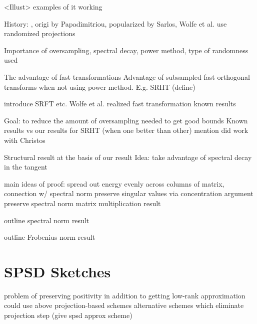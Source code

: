 \documentclass[xcolor={svgnames,pdftex,dvipsnames,table},10pt]{beamer} %
\begin{document}
\begin{frame}
 <Illust> examples of it working
\end{frame}

\begin{frame}
 History: , origi by Papadimitriou, popularized by Sarlos, Wolfe et al. use randomized projections 
\end{frame}

\begin{frame}
 Importance of oversampling, spectral decay, power method, type of randomness used
\end{frame}

\begin{frame}{The advantage of fast transformations}
 Advantage of subsampled fast orthogonal transforms when not using power method. E.g. SRHT (define) 
\end{frame}

\begin{frame}
introduce SRFT etc.
 Wolfe et al. realized fast transformation
 known results
 \end{frame}

\begin{frame}
Goal: to reduce the amount of oversampling needed to get good bounds
 Known results vs our results for SRHT (when one better than other)
 mention did work with Christos
\end{frame}

\begin{frame}
 Structural result at the basis of our result
 Idea: take advantage of spectral decay in the tangent
\end{frame}

\begin{frame}
 main ideas of proof: 
 spread out energy evenly across columns of matrix, connection w/ spectral norm
 preserve singular values via concentration argument
 preserve spectral norm
 matrix multiplication result
\end{frame}

\begin{frame}
 outline spectral norm result
\end{frame}

\begin{frame}
 outline Frobenius norm result
\end{frame}

\section{SPSD Sketches}
\begin{frame}
 problem of preserving positivity in addition to getting low-rank approximation
 could use above projection-based schemes
 alternative schemes which eliminate projection step (give spsd approx scheme)
\end{frame}
\end{document}

